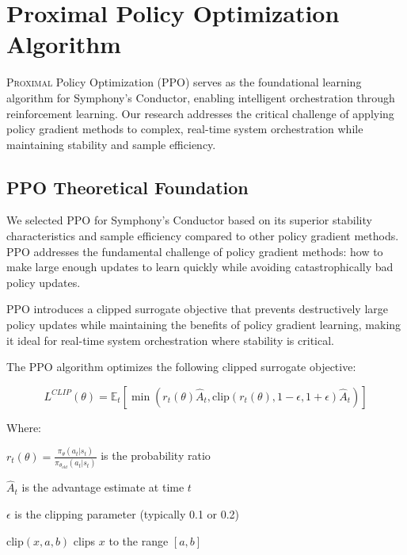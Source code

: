 
\section*{Proximal Policy Optimization Algorithm}

\lettrine{P}{roximal} Policy Optimization (PPO) serves as the foundational learning algorithm for Symphony's Conductor, enabling intelligent orchestration through reinforcement learning. Our research addresses the critical challenge of applying policy gradient methods to complex, real-time system orchestration while maintaining stability and sample efficiency.

\subsection*{PPO Theoretical Foundation}

We selected PPO for Symphony's Conductor based on its superior stability characteristics and sample efficiency compared to other policy gradient methods. PPO addresses the fundamental challenge of policy gradient methods: how to make large enough updates to learn quickly while avoiding catastrophically bad policy updates.

\begin{infobox}[title=PPO Key Innovation]
PPO introduces a clipped surrogate objective that prevents destructively large policy updates while maintaining the benefits of policy gradient learning, making it ideal for real-time system orchestration where stability is critical.
\end{infobox}

The PPO algorithm optimizes the following clipped surrogate objective:

\begin{equation}
L^{CLIP}(\theta) = \mathbb{E}_t \left[ \min \left( r_t(\theta) \hat{A}_t, \text{clip}(r_t(\theta), 1-\epsilon, 1+\epsilon) \hat{A}_t \right) \right]
\end{equation}

Where:
\begin{compactlist}
    \item $r_t(\theta) = \frac{\pi_\theta(a_t|s_t)}{\pi_{\theta_{old}}(a_t|s_t)}$ is the probability ratio
    \item $\hat{A}_t$ is the advantage estimate at time $t$
    \item $\epsilon$ is the clipping parameter (typically 0.1 or 0.2)
    \item $\text{clip}(x, a, b)$ clips $x$ to the range $[a, b]$
\end{compactlist}

